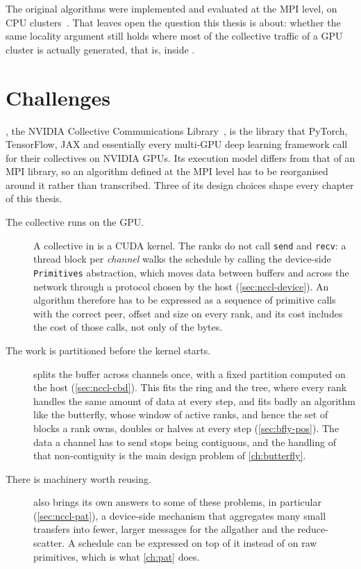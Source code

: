 The original \bine{} algorithms were implemented and evaluated at the MPI level, on CPU clusters~\cite{desensi2025bine}.
That leaves open the question this thesis is about: whether the same locality argument still holds where most of the collective traffic of a GPU cluster is actually generated, that is, inside \nccl{}.

\section{Challenges}\label{sec:intro-challenges}

\nccl{}, the NVIDIA Collective Communications Library~\cite{nccl}, is the library that PyTorch, TensorFlow, JAX and essentially every multi-GPU deep learning framework call for their collectives on NVIDIA GPUs.
Its execution model differs from that of an MPI library, so an algorithm defined at the MPI level has to be reorganised around it rather than transcribed.
Three of its design choices shape every chapter of this thesis.

\begin{description}
  \item[The collective runs on the GPU.] A collective in \nccl{} is a CUDA kernel.
    The ranks do not call \texttt{send} and \texttt{recv}: a thread block per \emph{channel} walks the schedule by calling the device-side \texttt{Primitives} abstraction, which moves data between buffers and across the network through a protocol chosen by the host (\cref{sec:nccl-device}).
    An algorithm therefore has to be expressed as a sequence of primitive calls with the correct peer, offset and size on every rank, and its cost includes the cost of those calls, not only of the bytes.
  \item[The work is partitioned before the kernel starts.] \nccl{} splits the buffer across channels once, with a fixed partition computed on the host (\cref{sec:nccl-cbd}).
    This fits the ring and the tree, where every rank handles the same amount of data at every step, and fits badly an algorithm like the \bine{} butterfly, whose window of active ranks, and hence the set of blocks a rank owns, doubles or halves at every step (\cref{sec:bfly-pos}).
    The data a channel has to send stops being contiguous, and the handling of that non-contiguity is the main design problem of \cref{ch:butterfly}.
  \item[There is machinery worth reusing.] \nccl{} also brings its own answers to some of these problems, in particular \pat{} (\cref{sec:nccl-pat}), a device-side mechanism that aggregates many small transfers into fewer, larger messages for the allgather and the reduce-scatter.
    A \bine{} schedule can be expressed on top of it instead of on raw primitives, which is what \cref{ch:pat} does.
\end{description}

